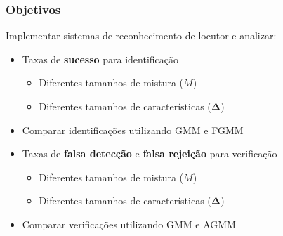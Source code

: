 \begin{frame}
\frametitle{Objetivos}
\begin{description}
    \item Implementar sistemas de reconhecimento de locutor e analizar:
    \pause
    \begin{itemize}
        \item Taxas de \textbf{sucesso} para identificação
        \pause
        \begin{itemize}
            \item Diferentes tamanhos de mistura ($M$)
            \pause
            \item Diferentes tamanhos de características ($\boldsymbol{\Delta}$)
            \pause
        \end{itemize}
        \item Comparar identificações utilizando GMM e FGMM
        \pause
        \item Taxas de \textbf{falsa detecção} e \textbf{falsa rejeição} para verificação
        \pause
        \begin{itemize}
            \item Diferentes tamanhos de mistura ($M$)
            \pause
            \item Diferentes tamanhos de características ($\boldsymbol{\Delta}$)
            \pause
        \end{itemize}
        \item Comparar verificações utilizando GMM e AGMM
    \end{itemize}
\end{description}
\end{frame}
